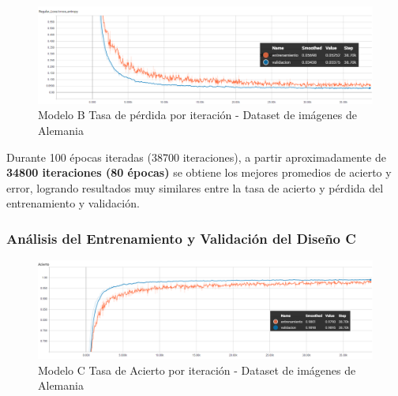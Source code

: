 			
			\begin{figure}[H]
				\begin{center}
				\includegraphics[width=1\textwidth]{images/desarrollo/trainResults/german/model1Loss_1} 
				\end{center}
				\begin{center}
				\caption{\small{Modelo B Tasa de pérdida por iteración - Dataset de imágenes de Alemania}}
				
				{\small{\fontsize{10}{16.8}\selectfont {Fuente: Elaboración propia}}}
				\end{center}
				\vspace{-1.5em}
			\end{figure}

			Durante 100 épocas iteradas (38700 iteraciones), a partir aproximadamente de \textbf{34800 iteraciones (80 épocas)} se obtiene los mejores promedios de acierto y error, logrando resultados muy similares entre la tasa de acierto y pérdida del entrenamiento y validación.



		\subsubsection{Análisis del Entrenamiento y Validación del Diseño C} 

			\begin{figure}[H]
				\begin{center}
				\includegraphics[width=1\textwidth]{images/desarrollo/trainResults/german/model4Acierto} 
				\end{center}
				\begin{center}
				\caption{\small{Modelo C Tasa de Acierto por iteración - Dataset de imágenes de Alemania  }}
				
				{\small{\fontsize{10}{16.8}\selectfont {Fuente: Elaboración propia}}}
				\end{center}
				\vspace{-1.5em}
			\end{figure}
			
